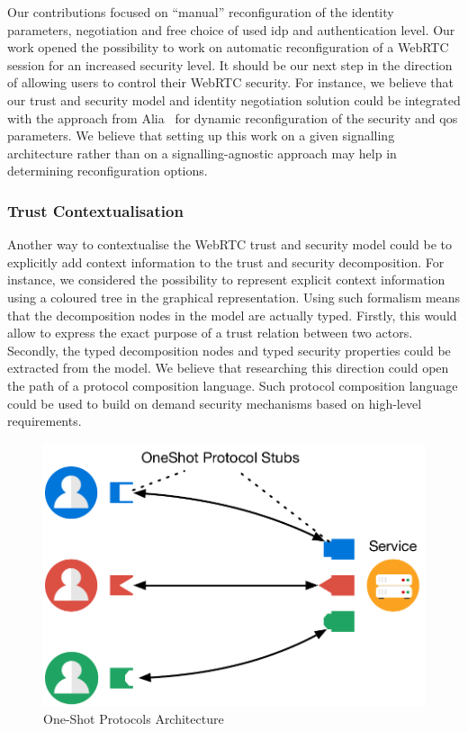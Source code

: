 Our contributions focused on ``manual'' reconfiguration of the identity parameters, \ie negotiation and free choice of used \gls{idp} and authentication level.
Our work opened the possibility to work on automatic reconfiguration of a WebRTC session for an increased security level.
It should be our next step in the direction of allowing users to control their WebRTC security.
For instance, we believe that our trust and security model and identity negotiation solution could be integrated with the approach from Alia~\etal\cite{alia2010putting} for dynamic reconfiguration of the security and \gls{qos} parameters.
We believe that setting up this work on a given signalling architecture rather than on a signalling-agnostic approach may help in determining reconfiguration options.

\subsubsection{Trust Contextualisation}
Another way to contextualise the WebRTC trust and security model could be to explicitly add context information to the trust and security decomposition.
For instance, we considered the possibility to represent explicit context information using a coloured tree in the graphical representation.
Using such formalism means that the decomposition nodes in the model are actually typed.
Firstly, this would allow to express the exact purpose of a trust relation between two actors.
Secondly, the typed decomposition nodes and typed security properties could be extracted from the model.
We believe that researching this direction could open the path of a protocol composition language. 
Such protocol composition language could be used to build on demand security mechanisms based on high-level requirements.

\begin{figure}
\centering
\includegraphics[scale=.5]{images/ossProto}
\caption{One-Shot Protocols Architecture}
\label{fig:oss}
\end{figure}


